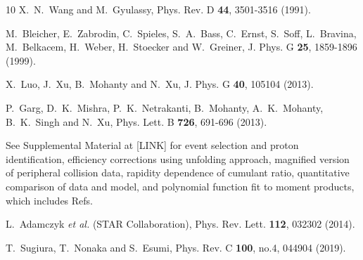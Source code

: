\documentclass[10pt,aps,prc,twocolumn,floatfix]{revtex4-1}
\begin{document}
\begin{thebibliography}{10}
X.~N.~Wang and M.~Gyulassy,
Phys. Rev. D \textbf{44}, 3501-3516 (1991).

M.~Bleicher, E.~Zabrodin, C.~Spieles, S.~A.~Bass, C.~Ernst, S.~Soff, L.~Bravina, M.~Belkacem, H.~Weber, H.~Stoecker and W.~Greiner,
J. Phys. G \textbf{25}, 1859-1896 (1999).

X.~Luo, J.~Xu, B.~Mohanty and N.~Xu,
J. Phys. G \textbf{40}, 105104 (2013).

P.~Garg, D.~K.~Mishra, P.~K.~Netrakanti, B.~Mohanty, A.~K.~Mohanty, B.~K.~Singh and N.~Xu,
Phys. Lett. B \textbf{726}, 691-696 (2013).

 See Supplemental Material at [LINK] for event selection and 
proton identification, efficiency corrections using unfolding 
approach, magnified version of peripheral collision data, rapidity
dependence of cumulant ratio, quantitative comparison of data and
model, and polynomial function 
fit to moment products, which includes Refs.~\cite{Llope:2003ti,Llope:2012zz,Anderson:2003ur,Esumi:2020xdo, Nonaka:2019fhk,Nonaka:2017kko, Nonaka:2018mgw}


L.~Adamczyk \textit{et al.} (STAR Collaboration),
Phys. Rev. Lett. \textbf{112}, 032302 (2014).

T.~Sugiura, T.~Nonaka and S.~Esumi,
Phys. Rev. C \textbf{100}, no.4, 044904 (2019).


\end{thebibliography}
\end{document}
